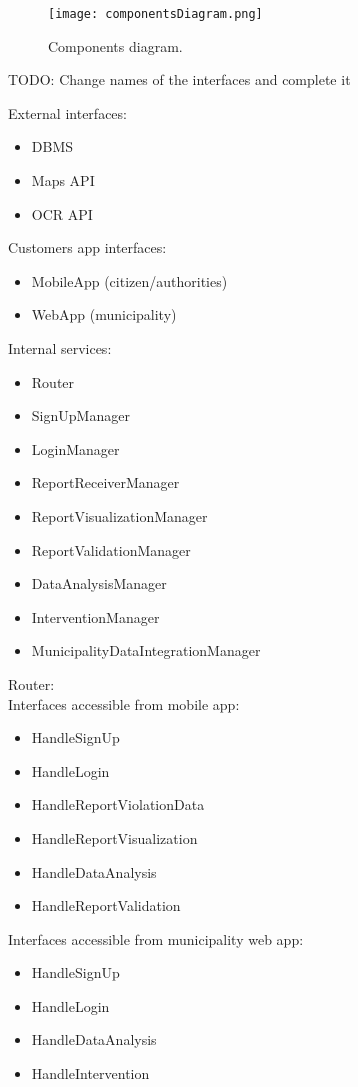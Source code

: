 \begin{figure}[H]
	\centering
	\texttt{[image: componentsDiagram.png]}
	\caption{Components diagram.}
\end{figure}
TODO: Change names of the interfaces and complete it

External interfaces:
\begin{itemize}
	\item DBMS
	\item Maps API
	\item OCR API
\end{itemize}

Customers app interfaces:
\begin{itemize}
	\item MobileApp (citizen/authorities)
	\item WebApp (municipality)
\end{itemize}

Internal services:
\begin{itemize}
	\item Router
	\item SignUpManager
	\item LoginManager
	\item ReportReceiverManager
	\item ReportVisualizationManager
	\item ReportValidationManager
	\item DataAnalysisManager
	\item InterventionManager
	\item MunicipalityDataIntegrationManager
\end{itemize}

\bigskip
Router:\\
Interfaces accessible from mobile app:
\begin{itemize}
	\item HandleSignUp
	\item HandleLogin
	\item HandleReportViolationData
	\item HandleReportVisualization
	\item HandleDataAnalysis
	\item HandleReportValidation
\end{itemize}
Interfaces accessible from municipality web app:
\begin{itemize}
	\item HandleSignUp
	\item HandleLogin
	\item HandleDataAnalysis
	\item HandleIntervention 
\end{itemize}

